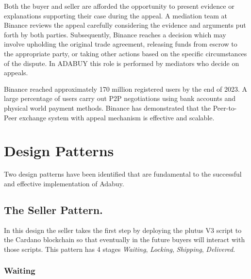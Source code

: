 \documentclass[12pt]{article}
\begin{document}
Both the buyer and seller are afforded the opportunity to present evidence or explanations supporting their case during the appeal. A mediation team at Binance reviews the appeal carefully considering the evidence and arguments put forth by both parties. Subsequently, Binance reaches a decision which may involve upholding the original trade agreement, releasing funds from escrow to the appropriate party, or taking other actions based on the specific circumstances of the dispute. In ADABUY this role is performed by mediators who decide on appeals.

Binance reached approximately 170 million registered users by the end of 2023. A large percentage of users carry out P2P negotiations using bank accounts and physical world payment methods. Binance has demonstrated that the Peer-to-Peer exchange system with appeal mechanism is effective and scalable.


\section{ Design Patterns }

Two design patterns have been identified that are fundamental to the successful and effective implementation of Adabuy.

\subsection { The Seller Pattern. } 

In this design the seller takes the first step by deploying the plutus V3 script to the Cardano blockchain so that eventually in the future buyers will interact with those scripts. This pattern has 4 stages \emph{Waiting}, \emph{Locking}, \emph{Shipping}, \emph{Delivered}.

\subsubsection { Waiting }
\end{document}
